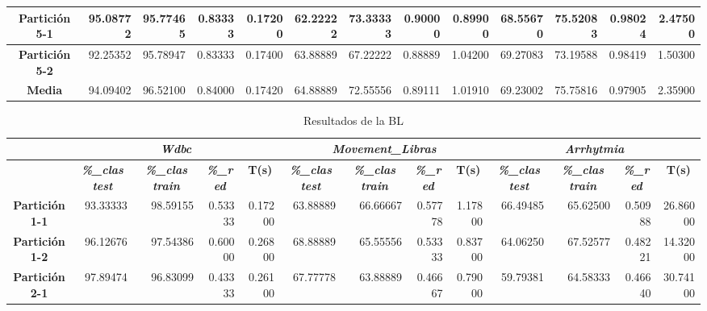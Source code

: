 \documentclass[a4paper,11pt]{article}
\begin{document}
\begin{table}[htbp]
\begin{adjustbox}{width=1.1\textwidth}
\begin{tabular}{|c|r|r|r|r|r|r|r|r|r|r|r|r|}
    \textbf{Partición 5-1} & 95.08772 & 95.77465 & 0.83333 & 0.17200 & 62.22222 & 73.33333 & 0.90000 & 0.89900 & 68.55670 & 75.52083 & 0.98024 & 2.47500 \\ \hline
    \textbf{Partición 5-2} & 92.25352 & 95.78947 & 0.83333 & 0.17400 & 63.88889 & 67.22222 & 0.88889 & 1.04200 & 69.27083 & 73.19588 & 0.98419 & 1.50300 \\ \hline
    \textbf{Media} & 94.09402 & 96.52100 & 0.84000 & 0.17420 & 64.88889 & 72.55556 & 0.89111 & 1.01910 & 69.23002 & 75.75816 & 0.97905 & 2.35900 \\ \hline
    \end{tabular}
    \end{adjustbox}
    \label{SFS}
  \end{table}
  
   \begin{table}[htbp]	
    \caption*{Resultados de la BL}
    \begin{adjustbox}{width=1.1\textwidth} 
    \begin{tabular}{|c|r|r|r|r|r|r|r|r|r|r|r|r|}
    \hline
    \multicolumn{1}{|l|}{} & \multicolumn{ 4}{c|}{\textbf{\textit{Wdbc}}} & \multicolumn{ 4}{c|}{\textbf{\textit{Movement\_Libras}}} & \multicolumn{ 4}{c|}{\textbf{\textit{Arrhytmia}}} \\ \hline
    & \multicolumn{1}{c|}{\textbf{\textit{\%\_clas test}}} & \multicolumn{1}{c|}{\textbf{\textit{\%\_clas train}}} & \multicolumn{1}{c|}{\textbf{\textit{\%\_red}}} & \multicolumn{1}{c|}{\textbf{T(s)}} & \multicolumn{1}{c|}{\textbf{\textit{\%\_clas test}}} & \multicolumn{1}{c|}{\textbf{\textit{\%\_clas train}}} & \multicolumn{1}{c|}{\textbf{\textit{\%\_red}}} & \multicolumn{1}{c|}{\textbf{T(s)}} & \multicolumn{1}{c|}{\textbf{\textit{\%\_clas test}}} & \multicolumn{1}{c|}{\textbf{\textit{\%\_clas train}}} & \multicolumn{1}{c|}{\textbf{\textit{\%\_red}}} & \multicolumn{1}{c|}{\textbf{T(s)}} \\ \hline
    \textbf{Partición 1-1} & 93.33333 & 98.59155 & 0.53333 & 0.17200 & 63.88889 & 66.66667 & 0.57778 & 1.17800 & 66.49485 & 65.62500 & 0.50988 & 26.86000 \\ \hline
    \textbf{Partición 1-2} & 96.12676 & 97.54386 & 0.60000 & 0.26800 & 68.88889 & 65.55556 & 0.53333 & 0.83700 & 64.06250 & 67.52577 & 0.48221 & 14.32000 \\ \hline
    \textbf{Partición 2-1} & 97.89474 & 96.83099 & 0.43333 & 0.26100 & 67.77778 & 63.88889 & 0.46667 & 0.79000 & 59.79381 & 64.58333 & 0.46640 & 30.74100 \\ \hline

\end{tabular}
\end{adjustbox}
\end{table}
\end{document}
